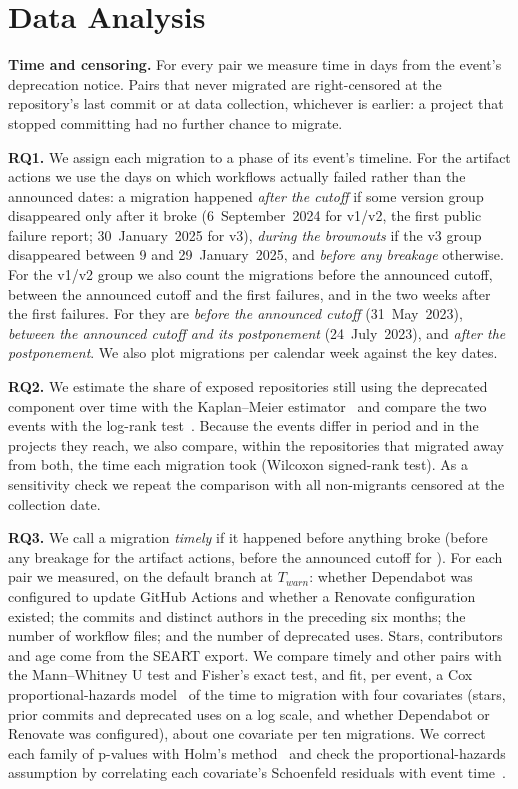 \section{Data Analysis}\label{sec:analysis}

\textbf{Time and censoring.}
For every pair we measure time in days from the event's deprecation notice.
Pairs that never migrated are right-censored at the repository's last commit or at data collection, whichever is earlier: a project that stopped committing had no further chance to migrate.

\textbf{RQ1.}
We assign each migration to a phase of its event's timeline.
For the artifact actions we use the days on which workflows actually failed rather than the announced dates: a migration happened \emph{after the cutoff} if some version group disappeared only after it broke (6~September~2024 for v1/v2, the first public failure report; 30~January~2025 for v3), \emph{during the brownouts} if the v3 group disappeared between 9 and 29~January~2025, and \emph{before any breakage} otherwise.
For the v1/v2 group we also count the migrations before the announced cutoff, between the announced cutoff and the first failures, and in the two weeks after the first failures.
For \so{} they are \emph{before the announced cutoff} (31~May~2023), \emph{between the announced cutoff and its postponement} (24~July~2023), and \emph{after the postponement}.
We also plot migrations per calendar week against the key dates.

\textbf{RQ2.}
We estimate the share of exposed repositories still using the deprecated component over time with the Kaplan--Meier estimator~\cite{kaplan1958} and compare the two events with the log-rank test~\cite{mantel1966}.
Because the events differ in period and in the projects they reach, we also compare, within the repositories that migrated away from both, the time each migration took (Wilcoxon signed-rank test).
As a sensitivity check we repeat the comparison with all non-migrants censored at the collection date.

\textbf{RQ3.}
We call a migration \emph{timely} if it happened before anything broke (before any breakage for the artifact actions, before the announced cutoff for \so{}).
For each pair we measured, on the default branch at $T_{warn}$: whether Dependabot was configured to update GitHub Actions and whether a Renovate configuration existed; the commits and distinct authors in the preceding six months; the number of workflow files; and the number of deprecated uses.
Stars, contributors and age come from the SEART export.
We compare timely and other pairs with the Mann--Whitney U test and Fisher's exact test, and fit, per event, a Cox proportional-hazards model~\cite{cox1972} of the time to migration with four covariates (stars, prior commits and deprecated uses on a log scale, and whether Dependabot or Renovate was configured), about one covariate per ten migrations.
We correct each family of p-values with Holm's method~\cite{holm1979} and check the proportional-hazards assumption by correlating each covariate's Schoenfeld residuals with event time~\cite{grambsch1994}.

